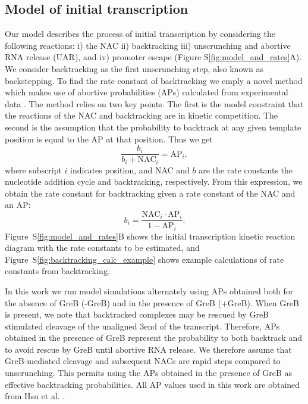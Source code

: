 %
\subsection{Model of initial transcription}
Our model describes the process of initial transcription by considering the
following reactions: i) the NAC ii) backtracking iii) unscrunching and abortive
RNA release (UAR), and iv) promoter escape (Figure
S\ref{fig:model_and_rates}A). We consider backtracking as the first
unscrunching step, also known as backstepping. To find the rate constant of
backtracking we emply a novel method which makes use of abortive probabilities
(APs) calculated from experimental data \cite{hsu_quantitative_1996}. The
method relies on two key points. The first is the model constraint that the
reactions of the NAC and backtracking are in kinetic competition. The second
is the assumption that the probability to backtrack at any given template
position is equal to the AP at that position. Thus we get
\begin{equation*}
    \frac{b_i}{b_i + \text{NAC}_i} = \text{AP}_i,
\end{equation*}
where subscript $i$ indicates position, and NAC and $b$ are the rate constants
the nucleotide addition cycle and backtracking, respectively. From this
expression, we obtain the rate constant for backtracking given a rate constant
of the NAC and an AP:
\begin{equation}
  b_i = \frac{\text{NAC}_i\cdot\text{AP}_i}{1-\text{AP}_i}.
  \label{eq:backtrackingcalc}
\end{equation}
Figure~S\ref{fig:model_and_rates}B shows the initial transcription kinetic
reaction diagram with the rate constants to be estimated, and
Figure~S\ref{fig:backtracking_calc_example} shows example calculations of rate
constants from backtracking.

In this work we run model simulations alternately using APs obtained both for
the absence of GreB (-GreB) and in the presence of GreB (+GreB). When GreB is
present, we note that backtracked complexes may be rescued by GreB stimulated
cleavage of the unaligned 3\ppp end of the transcript. Therefore, APs obtained
in the presence of GreB represent the probability to both backtrack and to
avoid rescue by GreB until abortive RNA release. We therefore assume that
GreB-mediated cleavage and subsequent NACs are rapid steps compared to
unscrunching. This permits using the APs obtained in the presence of GreB as
effective backtracking probabilities. All AP values used in this work are
obtained from Hsu et al. \cite{hsu_initial_2006}.

